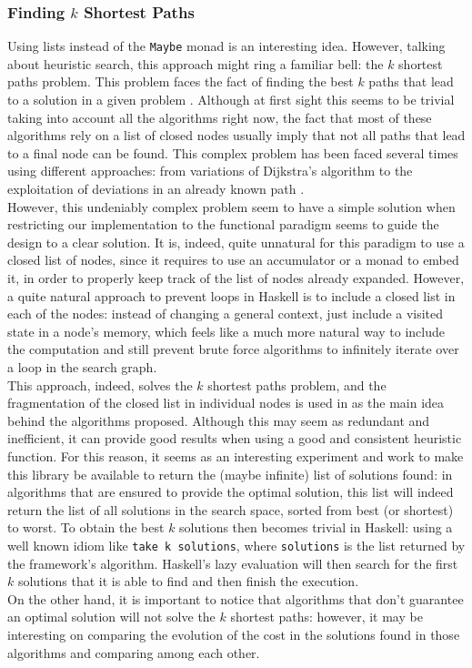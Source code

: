 \subsubsection{Finding $k$ Shortest Paths}

Using lists instead of the \texttt{Maybe} monad is an interesting idea.
However, talking about heuristic search, this approach might ring a familiar
bell: the $k$ shortest paths problem. This problem faces the fact of finding
the best $k$ paths that lead to a solution in a given problem
\cite{eppstein-1998-finding}. Although at first sight this seems to be trivial
taking into account all the algorithms right now, the fact that most of these
algorithms rely on a list of closed nodes usually imply that not all paths that
lead to a final node can be found. This complex problem has been faced several
times using different approaches: from variations of Dijkstra's algorithm to
the exploitation of deviations in an already known path
\cite{dreyfus-1969-appraisal}.\\

However, this undeniably complex problem seem to have a simple solution when
restricting our implementation to the functional paradigm seems to guide the
design to a clear solution. It is, indeed, quite unnatural for this paradigm to
use a closed list of nodes, since it requires to use an accumulator or a monad
to embed it, in order to properly keep track of the list of nodes already
expanded. However, a quite natural approach to prevent loops in Haskell is to
include a closed list in each of the nodes: instead of changing a general
context, just include a visited state in a node's memory, which feels like a
much more natural way to include the computation and still prevent brute force
algorithms to infinitely iterate over a loop in the search graph.\\

This approach, indeed, solves the $k$ shortest paths problem, and the
fragmentation of the closed list in individual nodes is used in
\cite{dechter-2012-search} as the main idea behind the algorithms proposed.
Although this may seem as redundant and inefficient, it can provide good
results when using a good and consistent heuristic function. For this reason,
it seems as an interesting experiment and work to make this library be
available to return the (maybe infinite) list of solutions found: in algorithms
that are ensured to provide the optimal solution, this list will indeed return
the list of all solutions in the search space, sorted from best (or shortest)
to worst. To obtain the best $k$ solutions then becomes trivial in Haskell:
using a well known idiom like \texttt{take k solutions}, where
\texttt{solutions} is the list returned by the framework's algorithm. Haskell's
lazy evaluation will then search for the first $k$ solutions that it is able to
find and then finish the execution.\\

On the other hand, it is important to notice that algorithms that don't
guarantee an optimal solution will not solve the $k$ shortest paths: however,
it may be interesting on comparing the evolution of the cost in the solutions
found in those algorithms and comparing among each other.\\

\newpage
